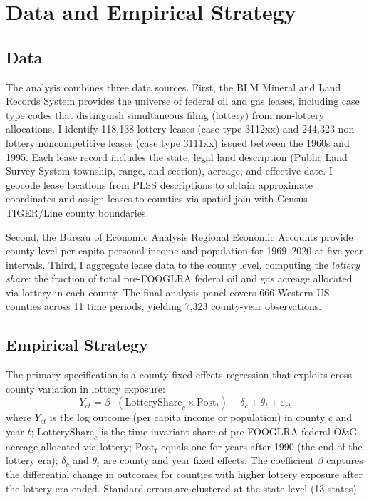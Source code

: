 \documentclass[12pt]{article}
\begin{document}
\section{Data and Empirical Strategy}

\subsection{Data}

The analysis combines three data sources. First, the BLM Mineral and Land Records System provides the universe of federal oil and gas leases, including case type codes that distinguish simultaneous filing (lottery) from non-lottery allocations. I identify 118,138 lottery leases (case type 3112xx) and 244,323 non-lottery noncompetitive leases (case type 3111xx) issued between the 1960s and 1995. Each lease record includes the state, legal land description (Public Land Survey System township, range, and section), acreage, and effective date. I geocode lease locations from PLSS descriptions to obtain approximate coordinates and assign leases to counties via spatial join with Census TIGER/Line county boundaries.

Second, the Bureau of Economic Analysis Regional Economic Accounts provide county-level per capita personal income and population for 1969--2020 at five-year intervals. Third, I aggregate lease data to the county level, computing the \textit{lottery share}: the fraction of total pre-FOOGLRA federal oil and gas acreage allocated via lottery in each county. The final analysis panel covers 666 Western US counties across 11 time periods, yielding 7,323 county-year observations.

\subsection{Empirical Strategy}

The primary specification is a county fixed-effects regression that exploits cross-county variation in lottery exposure:
\begin{equation}
    Y_{ct} = \beta \cdot (\text{LotteryShare}_c \times \text{Post}_t) + \delta_c + \theta_t + \varepsilon_{ct}
    \label{eq:main}
\end{equation}
where $Y_{ct}$ is the log outcome (per capita income or population) in county $c$ and year $t$; $\text{LotteryShare}_c$ is the time-invariant share of pre-FOOGLRA federal O\&G acreage allocated via lottery; $\text{Post}_t$ equals one for years after 1990 (the end of the lottery era); $\delta_c$ and $\theta_t$ are county and year fixed effects. The coefficient $\beta$ captures the differential change in outcomes for counties with higher lottery exposure after the lottery era ended. Standard errors are clustered at the state level (13 states).
\end{document}
